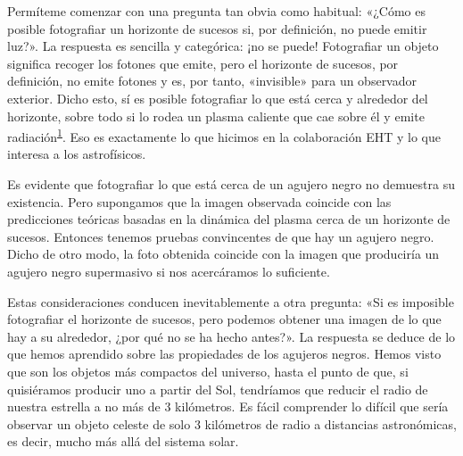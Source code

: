 Permíteme comenzar con una pregunta tan obvia como habitual: «¿Cómo es posible fotografiar un horizonte de sucesos si, por definición, no puede emitir luz?». La respuesta es sencilla y categórica: ¡no se puede! Fotografiar un objeto significa recoger los fotones que emite, pero el horizonte de sucesos, por definición, no emite fotones y es, por tanto, «invisible» para un observador exterior. Dicho esto, sí es posible fotografiar lo que está cerca y alrededor del horizonte, sobre todo si lo rodea un plasma caliente que cae sobre él y emite radiación\textsuperscript{\hyperlink{note:07-01}{1}}. Eso es exactamente lo que hicimos en la colaboración EHT y lo que interesa a los astrofísicos.

Es evidente que fotografiar lo que está cerca de un agujero negro no demuestra su existencia. Pero supongamos que la imagen observada coincide con las predicciones teóricas basadas en la dinámica del plasma cerca de un horizonte de sucesos. Entonces tenemos pruebas convincentes de que hay un agujero negro. Dicho de otro modo, la foto obtenida coincide con la imagen que produciría un agujero negro supermasivo si nos acercáramos lo suficiente.

Estas consideraciones conducen inevitablemente a otra pregunta: «Si es imposible fotografiar el horizonte de sucesos, pero podemos obtener una imagen de lo que hay a su alrededor, ¿por qué no se ha hecho antes?». La respuesta se deduce de lo que hemos aprendido sobre las propiedades de los agujeros negros. Hemos visto que son los objetos más compactos del universo, hasta el punto de que, si quisiéramos producir uno a partir del Sol, tendríamos que reducir el radio de nuestra estrella a no más de 3 kilómetros. Es fácil comprender lo difícil que sería observar un objeto celeste de solo 3 kilómetros de radio a distancias astronómicas, es decir, mucho más allá del sistema solar.

